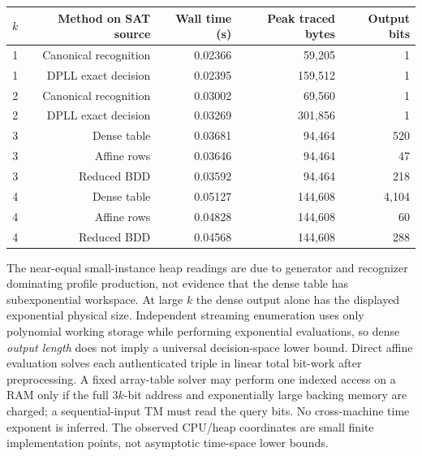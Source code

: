 \documentclass[10pt]{article}
\begin{document}
\begin{center}\begin{tabular}{rrrrr}\toprule
$k$ & Method on SAT source & Wall time (s) & Peak traced bytes & Output bits\\\midrule
1 & Canonical recognition & 0.02366 & 59,205 & 1\\
1 & DPLL exact decision & 0.02395 & 159,512 & 1\\
2 & Canonical recognition & 0.03002 & 69,560 & 1\\
2 & DPLL exact decision & 0.03269 & 301,856 & 1\\
3 & Dense table & 0.03681 & 94,464 & 520\\
3 & Affine rows & 0.03646 & 94,464 & 47\\
3 & Reduced BDD & 0.03592 & 94,464 & 218\\
4 & Dense table & 0.05127 & 144,608 & 4,104\\
4 & Affine rows & 0.04828 & 144,608 & 60\\
4 & Reduced BDD & 0.04568 & 144,608 & 288\\\bottomrule
\end{tabular}\end{center}
\noindent The near-equal small-instance heap readings are due to generator and recognizer dominating profile production, not evidence that the dense table has subexponential workspace. At large $k$ the dense output alone has the displayed exponential physical size. Independent streaming enumeration uses only polynomial working storage while performing exponential evaluations, so dense \emph{output length} does not imply a universal decision-space lower bound. Direct affine evaluation solves each authenticated triple in linear total bit-work after preprocessing. A fixed array-table solver may perform one indexed access on a RAM only if the full $3k$-bit address and exponentially large backing memory are charged; a sequential-input TM must read the query bits. No cross-machine time exponent is inferred. The observed CPU/heap coordinates are small finite implementation points, not asymptotic time-space lower bounds.
\end{document}
